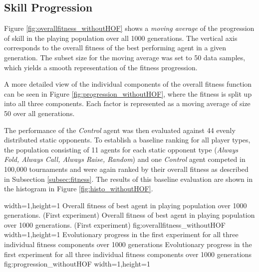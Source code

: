 \subsection{Skill Progression}
Figure \ref{fig:overallfitness_withoutHOF} shows a \textit{moving average} of the progression of skill in the playing population over all 1000 generations. The vertical axis corresponds to the overall fitness of the best performing agent in a given generation. The subset size for the moving average was set to 50 data samples, which yields a smooth representation of the fitness progression.\par
A more detailed view of the individual components of the overall fitness function can be seen in Figure \ref{fig:progression_withoutHOF}, where the fitness is split up into all three components. Each factor is represented as a moving average of size 50 over all generations.\par
The performance of the \textit{Control} agent was then evaluated against 44 evenly distributed static opponents. To establish a baseline ranking for all player types, the population consisting of 11 agents for each static opponent type (\textit{Always Fold, Always Call, Always Raise, Random}) and one \textit{Control} agent competed in 100,000 tournaments and were again ranked by their overall fitness as described in Subsection \ref{subsec:fitness}. The results of this baseline evaluation are shown in the histogram in Figure \ref{fig:histo_withoutHOF}. \par
{}%
  {width=1\textwidth,height=1\textheight}%
  {Overall fitness of best agent in playing population over 1000 generations. (First experiment)}%
  {Overall fitness of best agent in playing population over 1000 generations. (First experiment)}%
  {fig:overallfitness_withoutHOF}%
  {width=1\textwidth,height=1\textheight}%
  {Evolutionary progress in the first experiment for all three individual fitness components over 1000 generations}%
  {Evolutionary progress in the first experiment for all three individual fitness components over 1000 generations}%
  {fig:progression_withoutHOF}%
  {width=1\textwidth,height=1\textheight}%
